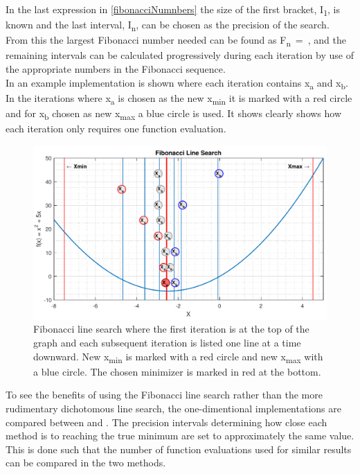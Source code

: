 In the last expression in \eqref{fibonacciNumnbers} the size of the first bracket, \si{I_1}, is known and the last interval, \si{I_n}, can be chosen as the precision of the search. From this the largest Fibonacci number needed can be found as \si{F_n = }, and the remaining intervals can be calculated progressively during each iteration by use of the appropriate numbers in the Fibonacci sequence.\\
In  an example implementation is shown where each iteration contains \si{x_a} and \si{x_b}. In the iterations where \si{x_a} is chosen as the new \si{x_{min}} it is marked with a red circle and for \si{x_b} chosen as new \si{x_{max}} a blue circle is used. It shows clearly shows how each iteration only requires one function evaluation.

\begin{figure}[H] 
	\centering
	\includegraphics[width=.9\textwidth]{figures/fibonacciLineSearchComprehension}
	\caption{Fibonacci line search where the first iteration is at the top of the graph and each subsequent iteration is listed one line at a time downward. New \si{x_{min}} is marked with a red circle and new \si{x_{max}} with a blue circle. The chosen minimizer is marked in red at the bottom.}
	\label{fibonacciLineSearchComprehensive}
\end{figure}

To see the benefits of using the Fibonacci line search rather than the more rudimentary dichotomous line search, the one-dimentional implementations are compared between  and . The precision intervals determining how close each method is to reaching the true minimum are set to approximately the same value. This is done such that the number of function evaluations used for similar results can be compared in the two methods.

